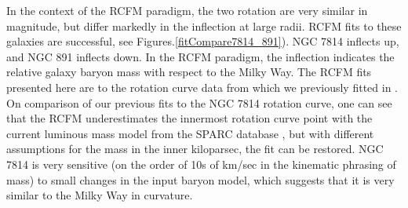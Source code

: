 \documentclass[reprint,%
 amsmath,amssymb,
 aps,
]{revtex4-1}
\begin{document}
 
 In the context of the RCFM  paradigm, the two rotation are  very similar in magnitude,  but   differ markedly in the inflection  at large radii.    RCFM  
fits to these galaxies are successful, see Figures.\ref{fitCompare7814_891}). 
 NGC 7814 inflects up, and  NGC 891 inflects down.
 In the RCFM paradigm, the inflection  indicates   the  relative galaxy baryon mass    with respect to   the Milky Way.  
 The RCFM fits presented here are to the  rotation curve data from   \cite{Frat} which we previously fitted in  \cite{Cisneros:2013vha,Cisneros:2014fea,Cisneros2015,Cisn2016}. On comparison of our   previous fits to the NGC 7814 rotation curve,  one can see that the RCFM underestimates the innermost rotation curve point with the current luminous mass model from   the SPARC database \cite{2016Lelli}, but   with different assumptions for  the mass  in the inner kiloparsec, the fit can be restored. NGC 7814 is very sensitive (on the order of 10s of km/sec in the kinematic phrasing of mass) to small changes in the input  baryon model, which suggests that  it is very similar to the Milky Way in curvature.
 
 
 
\end{document}
